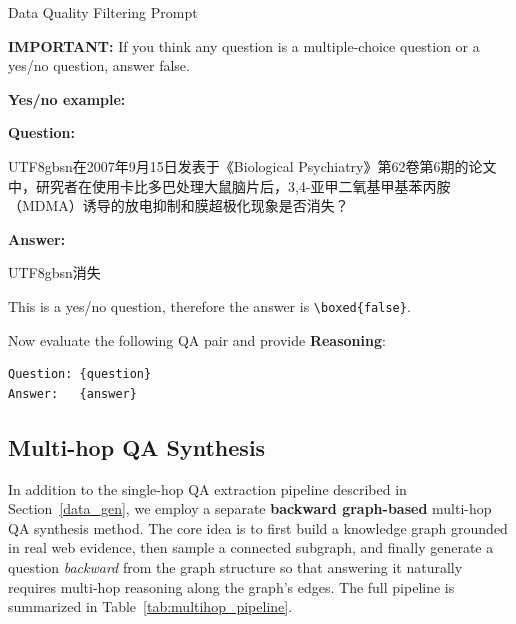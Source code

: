 \documentclass{article} %
\newcommand{\zh}[1]{\begin{CJK*}{UTF8}{gbsn}#1\end{CJK*}}
\newcommand{\zh}[1]{#1}
\theoremstyle{plain}
\theoremstyle{definition}
\theoremstyle{remark}
\begin{document}
\begin{promptbox}{Data Quality Filtering Prompt}
\noindent\hrulefill

\textbf{IMPORTANT:} If you think any question is a multiple-choice question or a yes/no question, answer false.

\textbf{Yes/no example:}

\textbf{Question:} \zh{在2007年9月15日发表于《Biological Psychiatry》第62卷第6期的论文中，研究者在使用卡比多巴处理大鼠脑片后，3,4-亚甲二氧基甲基苯丙胺（MDMA）诱导的放电抑制和膜超极化现象是否消失？}

\textbf{Answer:} \zh{消失}

This is a yes/no question, therefore the answer is \texttt{\textbackslash boxed\{false\}}.

Now evaluate the following QA pair and provide \textbf{Reasoning}:
\begin{lstlisting}[basicstyle=\ttfamily\footnotesize,breaklines=true]
Question: {question}
Answer:   {answer}
\end{lstlisting}
\end{promptbox}
\subsection{Multi-hop QA Synthesis}

In addition to the single-hop QA extraction pipeline described in Section~\ref{data_gen}, we employ a separate \textbf{backward graph-based} multi-hop QA synthesis method. The core idea is to first build a knowledge graph grounded in real web evidence, then sample a connected subgraph, and finally generate a question \emph{backward} from the graph structure so that answering it naturally requires multi-hop reasoning along the graph's edges. The full pipeline is summarized in Table~\ref{tab:multihop_pipeline}.
\end{document}

